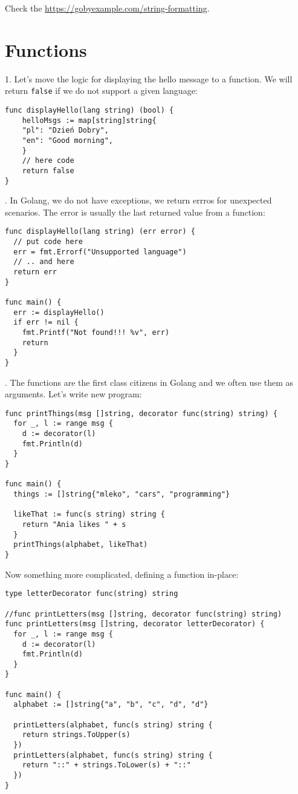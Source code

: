 \documentclass[11pt, letterpaper]{article}
\begin{document}
Check the \href{https://gobyexample.com/string-formatting}{https://gobyexample.com/string-formatting}.

\section{Functions}

1. Let's move the logic for displaying the hello message to a function. We will return \verb|false| if we do not support a given language:

\begin{verbatim}
func displayHello(lang string) (bool) {
    helloMsgs := map[string]string{
    "pl": "Dzień Dobry",
    "en": "Good morning",
    }
    // here code
    return false
}
\end{verbatim}

. In Golang, we do not have exceptions, we return errros for unexpected scenarios. The error is usually the last returned value from a function:

\begin{verbatim}
func displayHello(lang string) (err error) {
  // put code here
  err = fmt.Errorf("Unsupported language")
  // .. and here
  return err
}

func main() {
  err := displayHello()
  if err != nil {
    fmt.Printf("Not found!!! %v", err)
    return
  }
}
\end{verbatim}

. The functions are the first class citizens in Golang and we often use them as arguments. Let's write new program:

\begin{verbatim}
func printThings(msg []string, decorator func(string) string) {
  for _, l := range msg {
    d := decorator(l)
    fmt.Println(d)
  }
}

func main() {
  things := []string{"mleko", "cars", "programming"}

  likeThat := func(s string) string {
    return "Ania likes " + s
  }
  printThings(alphabet, likeThat)
}
\end{verbatim}

Now something more complicated, defining a function in-place:

\begin{verbatim}
type letterDecorator func(string) string

//func printLetters(msg []string, decorator func(string) string)
func printLetters(msg []string, decorator letterDecorator) {
  for _, l := range msg {
    d := decorator(l)
    fmt.Println(d)
  }
}

func main() {
  alphabet := []string{"a", "b", "c", "d", "d"}

  printLetters(alphabet, func(s string) string {
    return strings.ToUpper(s)
  })
  printLetters(alphabet, func(s string) string {
    return "::" + strings.ToLower(s) + "::"
  })
}
\end{verbatim}
\end{document}
